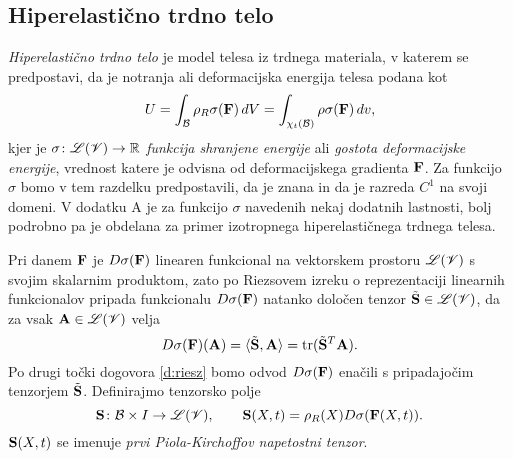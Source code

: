 \subsection{Hiperelastično trdno telo}


\emph{Hiperelastično trdno telo} je model telesa iz trdnega materiala, v katerem se predpostavi,
da je notranja ali deformacijska energija telesa podana kot
\[ U=\int_{\mathcal B}\rho_R \sigma(\mathbf F)\,dV=\int_{\chi_t(\mathcal B)}\rho\sigma(\mathbf F)\,dv, \]
kjer je $\sigma\colon\mathscr L(\mathscr V)\to\mathbb R$ \emph{funkcija shranjene energije} ali \emph{gostota deformacijske energije},
vrednost katere je odvisna od
deformacijskega gradienta $\mathbf F$. Za funkcijo $\sigma$ bomo v tem razdelku predpostavili, da je znana in da je
razreda $C^1$ na svoji domeni. V dodatku A je za funkcijo $\sigma$ navedenih nekaj dodatnih lastnosti,
bolj podrobno pa je obdelana za primer izotropnega hiperelastičnega trdnega telesa.

Pri danem $\mathbf F$ je $D\sigma(\mathbf F)$ linearen funkcional
na vektorskem prostoru $\mathscr L(\mathscr V)$ s svojim skalarnim produktom, zato po Riezsovem izreku
o reprezentaciji linearnih funkcionalov pripada funkcionalu $D\sigma(\mathbf F)$ natanko
določen tenzor $\tilde{\mathbf S}\in\mathscr L(\mathscr V)$, da za vsak $\mathbf A\in\mathscr L(\mathscr V)$ velja
\[ D\sigma(\mathbf F)(\mathbf A)=\langle\tilde{\mathbf S},\mathbf A\rangle=\mathrm{tr}(\tilde{\mathbf S}^{T}\mathbf A). \]
Po drugi točki dogovora \ref{d:riesz}
bomo odvod $D\sigma(\mathbf F)$ enačili s pripadajočim tenzorjem $\tilde{\mathbf S}$.
Definirajmo tenzorsko polje
\begin{equation} \label{e:piola}
	\ten{S}\colon \B\times I\to\L(\V),\qquad
	\ten{S}(X,t)=\rho_R(X)D\sigma(\ten{F}(X,t)).%
\end{equation}
$\mathbf S(X,t)$ se imenuje \emph{prvi Piola-Kirchoffov napetostni tenzor}.

